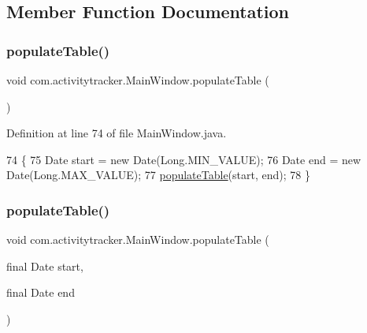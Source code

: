 \subsection{Member Function Documentation}
\mbox{\label{classcom_1_1activitytracker_1_1_main_window_ae3955dd50087d95257d029b9c67ac185}} 
\subsubsection{\texorpdfstring{populate\+Table()}{populateTable()}\hspace{0.1cm}{\footnotesize\ttfamily [1/2]}}
{\footnotesize\ttfamily void com.\+activitytracker.\+Main\+Window.\+populate\+Table (\begin{DoxyParamCaption}{ }\end{DoxyParamCaption})\hspace{0.3cm}{\ttfamily [private]}}



Definition at line 74 of file Main\+Window.\+java.


\begin{DoxyCode}
74                                  \{
75         Date start = \textcolor{keyword}{new} Date(Long.MIN\_VALUE);
76         Date end = \textcolor{keyword}{new} Date(Long.MAX\_VALUE);
77         \mbox{\hyperlink{classcom_1_1activitytracker_1_1_main_window_ae3955dd50087d95257d029b9c67ac185}{populateTable}}(start, end);
78     \}
\end{DoxyCode}
\mbox{\label{classcom_1_1activitytracker_1_1_main_window_a351c3d78c28ae23cd645e86fe30688c7}} 
\subsubsection{\texorpdfstring{populate\+Table()}{populateTable()}\hspace{0.1cm}{\footnotesize\ttfamily [2/2]}}
{\footnotesize\ttfamily void com.\+activitytracker.\+Main\+Window.\+populate\+Table (\begin{DoxyParamCaption}\item[{final Date}]{start,  }\item[{final Date}]{end }\end{DoxyParamCaption})\hspace{0.3cm}{\ttfamily [private]}}



